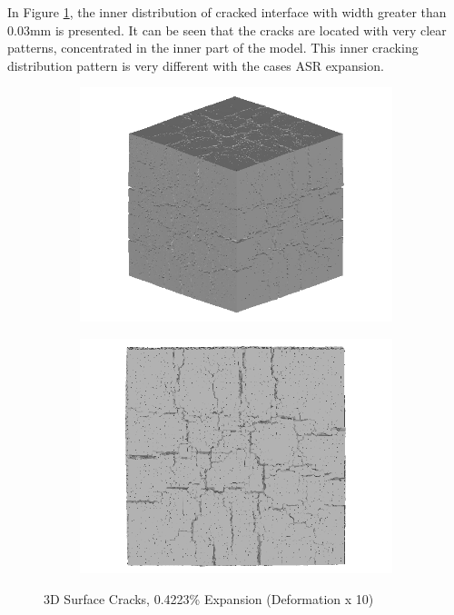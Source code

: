 In Figure \ref{fig:DEF_A30X0C_3_3D}, the inner distribution of cracked interface with width greater than 0.03mm is presented. It can be seen that the cracks are located with very clear patterns, concentrated in the inner part of the model. This inner cracking distribution pattern is very different with the cases ASR expansion.

  \begin{figure}[ht!]
  \centering
      \begin{subfigure}{.5\textwidth}
        \centering
        \includegraphics[width=.8\linewidth]{Files/exp_3D/DEF/A30X0C_3_3d.png}
      \end{subfigure}%
      \begin{subfigure}{.5\textwidth}
        \centering
        \includegraphics[width=.8\linewidth]{Files/exp_3D/DEF/A30X0C_3_3ds.png}
        \end{subfigure}
    \caption{3D Surface Cracks, 0.4223\% Expansion (Deformation x 10)}
    \label{fig:DEF_A30X0C_3_3D}
  \end{figure}

